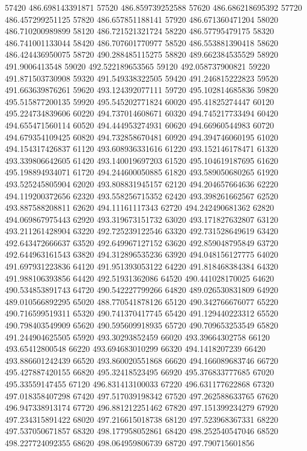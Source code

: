 {57420 486.698143391871
57520 486.859739252588
57620 486.686218695392
57720 486.457299251125
57820 486.657851188141
57920 486.671360471204
58020 486.710200989899
58120 486.721521321724
58220 486.57795479175
58320 486.741001133044
58420 486.707601770977
58520 486.553881390418
58620 486.424436950075
58720 490.288485115275
58820 489.662384535529
58920 491.9006413548
59020 492.522189653565
59120 492.058737900821
59220 491.871503730908
59320 491.549338322505
59420 491.246815222823
59520 491.663639876261
59620 493.124392077111
59720 495.102814685836
59820 495.515877200135
59920 495.545202771824
60020 495.41825274447
60120 495.224734839606
60220 494.737014608671
60320 494.745217733494
60420 494.655471560114
60520 494.444953274931
60620 494.66960544983
60720 494.679354109425
60820 494.732858670481
60920 494.394746060195
61020 494.154317426837
61120 493.608936331616
61220 493.152146178471
61320 493.339806642605
61420 493.140019697203
61520 495.104619187695
61620 495.198894934071
61720 494.244600050885
61820 493.589050680265
61920 493.525245805904
62020 493.808831945157
62120 494.204657664636
62220 494.119200372656
62320 493.558256715352
62420 493.398261662567
62520 493.887588208811
62620 494.11161117343
62720 494.242490681362
62820 494.069867975443
62920 493.319673151732
63020 493.171827632807
63120 493.211261428904
63220 492.725239122546
63320 492.731528649619
63420 492.643472666637
63520 492.649967127152
63620 492.859048795849
63720 492.644963161543
63820 494.312896535236
63920 494.048156127775
64020 491.697931223836
64120 491.951393053122
64220 491.818468384384
64320 491.988106393856
64420 492.51931362086
64520 490.441028170025
64620 490.534853891743
64720 490.542227799266
64820 489.026530831809
64920 489.010566892295
65020 488.770541878126
65120 490.342766676077
65220 490.716599519311
65320 490.741370417745
65420 491.129440223312
65520 490.798403549909
65620 490.595609918935
65720 490.709653253549
65820 491.244904625505
65920 493.30293852459
66020 493.39664302758
66120 493.65412800548
66220 493.694683010299
66320 494.1418207239
66420 493.886601242439
66520 493.860020551868
66620 494.166089683746
66720 495.427887420155
66820 495.32418523495
66920 495.376833777685
67020 495.33559147455
67120 496.831413100033
67220 496.631177622868
67320 497.018358407298
67420 497.517039198342
67520 497.262588633765
67620 496.947338913174
67720 496.881212251462
67820 497.151399234279
67920 497.234315891422
68020 497.216615018738
68120 497.523968367331
68220 497.537050671857
68320 498.177958052861
68420 498.252540547046
68520 498.227724092355
68620 498.064959806739
68720 497.790715601856
}
